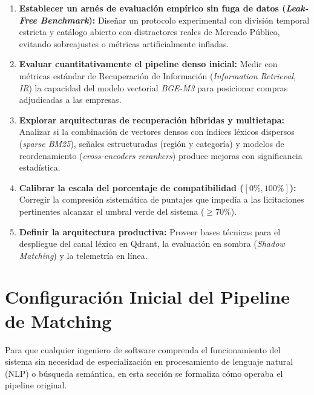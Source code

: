 \documentclass[11pt,a4paper]{article}
\begin{document}
\begin{enumerate}[leftmargin=*]
    \item \textbf{Establecer un arnés de evaluación empírico sin fuga de datos (\textit{Leak-Free Benchmark}):} Diseñar un protocolo experimental con división temporal estricta y catálogo abierto con distractores reales de Mercado Público, evitando sobreajustes o métricas artificialmente infladas.
    \item \textbf{Evaluar cuantitativamente el pipeline denso inicial:} Medir con métricas estándar de Recuperación de Información (\textit{Information Retrieval, IR}) la capacidad del modelo vectorial \textit{BGE-M3} para posicionar compras adjudicadas a las empresas.
    \item \textbf{Explorar arquitecturas de recuperación híbridas y multietapa:} Analizar si la combinación de vectores densos con índices léxicos dispersos (\textit{sparse BM25}), señales estructuradas (región y categoría) y modelos de reordenamiento (\textit{cross-encoders rerankers}) produce mejoras con significancia estadística.
    \item \textbf{Calibrar la escala del porcentaje de compatibilidad ($[0\%, 100\%]$):} Corregir la compresión sistemática de puntajes que impedía a las licitaciones pertinentes alcanzar el umbral verde del sistema ($\ge 70\%$).
    \item \textbf{Definir la arquitectura productiva:} Proveer bases técnicas para el despliegue del canal léxico en Qdrant, la evaluación en sombra (\textit{Shadow Matching}) y la telemetría en línea.
\end{enumerate}

\section{Configuración Inicial del Pipeline de Matching}

Para que cualquier ingeniero de software comprenda el funcionamiento del sistema sin necesidad de especialización en procesamiento de lenguaje natural (NLP) o búsqueda semántica, en esta sección se formaliza cómo operaba el pipeline original.
\end{document}
